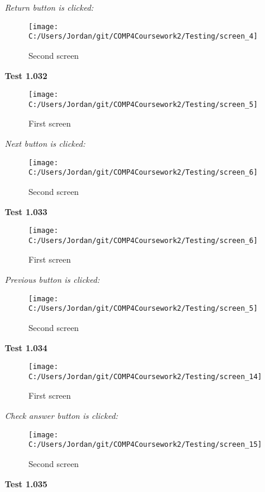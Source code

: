 \textit{Return button is clicked: }

\begin{figure}[H]
    \label{fig: Second Screen}\caption{Second screen}
    \texttt{[image: C:/Users/Jordan/git/COMP4Coursework2/Testing/screen\_4]}
\end{figure}

\textbf{Test 1.032}

\begin{figure}[H]
    \label{fig: First Screen}\caption{First screen}
    \texttt{[image: C:/Users/Jordan/git/COMP4Coursework2/Testing/screen\_5]}
\end{figure}

\textit{Next button is clicked: }

\begin{figure}[H]
    \label{fig: Second Screen}\caption{Second screen}
    \texttt{[image: C:/Users/Jordan/git/COMP4Coursework2/Testing/screen\_6]}
\end{figure}

\textbf{Test 1.033}

\begin{figure}[H]
    \label{fig: First Screen}\caption{First screen}
    \texttt{[image: C:/Users/Jordan/git/COMP4Coursework2/Testing/screen\_6]}
\end{figure}

\textit{Previous button is clicked: }

\begin{figure}[H]
    \label{fig: Second Screen}\caption{Second screen}
    \texttt{[image: C:/Users/Jordan/git/COMP4Coursework2/Testing/screen\_5]}
\end{figure}

\textbf{Test 1.034}

\begin{figure}[H]
    \label{fig: First Screen}\caption{First screen}
    \texttt{[image: C:/Users/Jordan/git/COMP4Coursework2/Testing/screen\_14]}
\end{figure}

\textit{Check answer button is clicked: }

\begin{figure}[H]
    \label{fig: Second Screen}\caption{Second screen}
    \texttt{[image: C:/Users/Jordan/git/COMP4Coursework2/Testing/screen\_15]}
\end{figure}

\textbf{Test 1.035}

